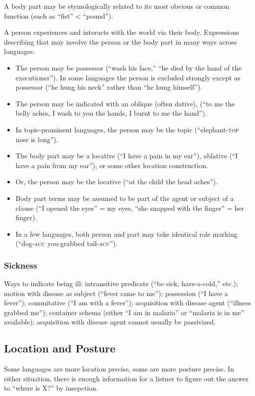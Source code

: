 \documentclass[11pt]{article}
\newcommand{\I}[1]{\textsc{#1}}   %
\newenvironment{grammarlist}%
 {\begin{itemize}\addtolength{\itemsep}{-0.5\baselineskip}\ignorespaces}%
 {\end{itemize}\ignorespacesafterend}
\begin{document}
{A body part may be etymologically related to its most obvious or
common function (such as ``fist'' < ``pound'').

A person experiences and interacts with the world via their body.
Expressions describing that may involve the person or the body part in
many ways across languages.

\begin{grammarlist}
  \item The person may be possessor (``wash his face,'' ``he died by
    the hand of the executioner'').  In some languages the person is
    excluded strongly except as possessor (``he hung his neck'' rather
    than ``he hung himself'').
  \item The person may be indicated with an oblique (often dative),
    (``to me the belly aches, I wash to you the hands, I burnt to me
    the hand'').
  \item In topic-prominent languages, the person may be the topic
    (``elephant-\I{top} nose is long'').
  \item The body part may be a locative (``I have a pain in my ear''),
    ablative (``I have a pain from my ear''), or some other location
    construction.
  \item Or, the person may be the locative (``at the child the head
    aches'').
  \item Body part terms may be assumed to be part of the agent or
    subject of a clause (``I opened the eyes'' = my eyes, ``she
    snapped with the finger'' = her finger).
  \item In a few languages, both person and part may take identical
    role marking (``dog-\I{acc} you-grabbed tail-\I{acc}'').
\end{grammarlist}

\subsubsection{Sickness}
Ways to indicate being ill: intransitive predicate (``be sick,
have-a-cold,'' etc.); motion with disease as subject (``fever came to
me'');  possession (``I have a fever''); commitative (``I am with a
fever''); acquisition with disease agent (``illness grabbed me'');
container schema (either ``I am in malaria'' or ``malaria is in me''
available); acquisition with disease agent cannot usually be
passivized.

\subsection{Location and Posture}
Some languages are more location precise, some are more posture
precise.  In either situation, there is enough information for a
listner to figure out the answer to ``where is X?'' by insepction.

}
\end{document}
